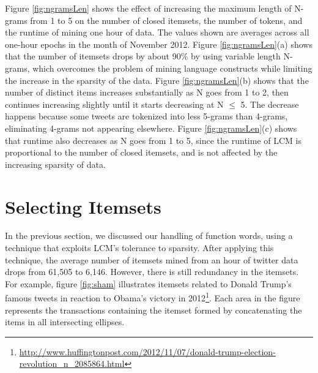 \documentclass{sig-alternate}
\begin{document}
Figure \ref{fig:ngramsLen} shows the effect of increasing the maximum length
of N-grams from 1 to 5 on 
the number of closed itemsets,
the number of tokens, 
and the runtime of mining one hour of data.
The values shown are averages across all one-hour epochs in the month of
November 2012.
Figure \ref{fig:ngramsLen}(a) shows that the number of itemsets 
drops by about 90\% by using variable length N-grams,
which overcomes the problem of mining language constructs
while limiting the increase in the sparsity of the data.
Figure \ref{fig:ngramsLen}(b) shows that the number of distinct items
increases substantially as N goes from 1 to 2, then continues increasing
slightly until it starts decreasing at N $\le$ 5. %
The decrease happens because 
some tweets are tokenized into less 5-grams than 4-grams,
eliminating 4-grams not appearing elsewhere.
Figure \ref{fig:ngramsLen}(c) shows that runtime also decreases as N goes
from 1 to 5, since the runtime of LCM  is proportional to the number of closed
itemsets, %
and is not affected by the increasing sparsity of data.


\section{Selecting Itemsets} 
\label{sec:strong}



In the previous section, we discussed our handling of function words,
using a technique that exploits LCM's tolerance to sparsity.
After applying this technique, the average number of itemsets mined from an
hour of twitter data drops from 61,505 to 6,146.
However, there is still redundancy in the itemsets.
For example, figure \ref{fig:sham} illustrates  itemsets related to Donald
Trump's famous tweets in reaction to Obama's victory in
2012\footnote{\scriptsize \url{http://www.huffingtonpost.com/2012/11/07/donald-trump-election-revolution_n_2085864.html}}.  
Each area in the figure represents the transactions containing the itemset
formed by concatenating the items in all intersecting ellipses. 
\end{document}
